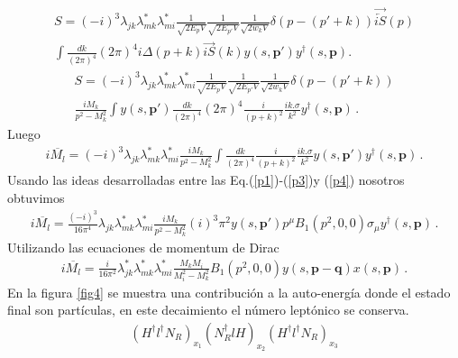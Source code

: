 \begin{align}
S={(-i)^{3}}\lambda_{jk}\lambda^*_{mk}\lambda^*_{mi}\frac{1}{\sqrt{2E_p V}}\frac{1}{\sqrt{2E_{p'} V}}\frac{1}{\sqrt{2w_k V}}\delta(p-(p'+k))\overrightarrow{\overleftarrow{iS}}(p)\nonumber \\ \int \frac{dk}{(2\pi)^4}(2\pi)^4i\Delta(p+k){\overrightarrow{iS}}(k)y(s,\boldsymbol{p'})y^{\dagger}(s,\boldsymbol{p}).
\end{align}
\begin{align}
S={(-i)^{3}}\lambda_{jk}\lambda^*_{mk}\lambda^*_{mi}\frac{1}{\sqrt{2E_p V}}\frac{1}{\sqrt{2E_{p'} V}}\frac{1}{\sqrt{2w_k V}}\delta(p-(p'+k))\\
\frac{iM_{k}}{p^2-M_{k}^2}\int y(s,\boldsymbol{p'}) \frac{dk}{(2\pi)^4}(2\pi)^4\frac{i}{(p+k)^2}\frac{ik.{\sigma}}{k^2}y^{\dagger}(s,\boldsymbol{p})\, . 
\end{align}
Luego 
\begin{align}
i\overline{M_{l}}={(-i)^{3}}\lambda_{jk}\lambda^*_{mk}\lambda^*_{mi}\frac{iM_{k}}{p^2-M_{k}^2}\int \frac{dk}{(2\pi)^4}\frac{i}{(p+k)^2}\frac{ik.{\sigma}}{k^2}y(s,\boldsymbol{p'})y^{\dagger}(s,\boldsymbol{p})\, . 
\end{align}
Usando las ideas desarrolladas entre las Eq.(\ref{p1})-(\ref{p3})y (\ref{p4}) nosotros obtuvimos 
\begin{align}
i\overline{M_{l}}=\frac{{(-i)^{3}}}{16\pi^4}\lambda_{jk}\lambda^*_{mk}\lambda^*_{mi}\frac{iM_{k}}{p^2-M_{k}^2}(i)^3\pi^2y(s,\boldsymbol{p'})p^{\mu}B_{1}(p^2,0,0){\sigma}_{\mu}y^{\dagger}(s,\boldsymbol{p})\, . 
\end{align}
Utilizando las ecuaciones de momentum de Dirac~\cite{Dreiner:2008tw}
\begin{align}
i\overline{M_{l}}=\frac{i}{16\pi^2}\lambda^*_{jk}\lambda^*_{mk}\lambda^*_{mi}\frac{M_{k}M_{i}}{M_i^2-M_{k}^2}B_{1}(p^2,0,0)y(s,\boldsymbol{p-q})x(s,\boldsymbol{p})\, . 
\end{align}
En la figura \ref{fig4} se muestra una contribución a la auto-energía donde el estado final son partículas, en este decaimiento el número leptónico  se conserva.
\begin{align}
(H^{\dagger}l^{\dagger} N_{R})_{x_{1}}
(N_{R}^{\dagger}lH)_{x_{2}}
(H^{\dagger}l^{\dagger} N_{R})_{x_{3}}
\end{align}

